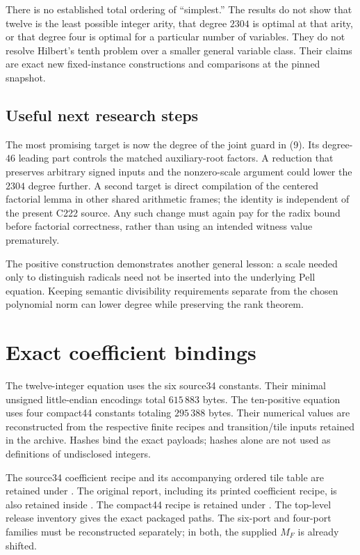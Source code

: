 \documentclass[11pt,letterpaper]{article}
\theoremstyle{definition}\newtheorem{definition}[theorem]{Definition}
\theoremstyle{remark}\newtheorem{remark}[theorem]{Remark}
\begin{document}
There is no established total ordering of ``simplest.'' The results do not show that twelve is the least possible integer arity, that degree $2304$ is optimal at that arity, or that degree four is optimal for a particular number of variables. They do not resolve Hilbert's tenth problem over a smaller general variable class. Their claims are exact new fixed-instance constructions and comparisons at the pinned snapshot.

\subsection{Useful next research steps}
The most promising target is now the degree of the joint guard in (9). Its degree-$46$ leading part controls the matched auxiliary-root factors. A reduction that preserves arbitrary signed inputs and the nonzero-scale argument could lower the $2304$ degree further. A second target is direct compilation of the centered factorial lemma in other shared arithmetic frames; the identity is independent of the present C222 source. Any such change must again pay for the radix bound before factorial correctness, rather than using an intended witness value prematurely.

The positive construction demonstrates another general lesson: a scale needed only to distinguish radicals need not be inserted into the underlying Pell equation. Keeping semantic divisibility requirements separate from the chosen polynomial norm can lower degree while preserving the rank theorem.

\appendix
\section{Exact coefficient bindings}\label{app:constants}
The twelve-integer equation uses the six source34 constants. Their minimal unsigned little-endian encodings total $615\,883$ bytes. The ten-positive equation uses four compact44 constants totaling $295\,388$ bytes. Their numerical values are reconstructed from the respective finite recipes and transition/tile inputs retained in the archive. Hashes bind the exact payloads; hashes alone are not used as definitions of undisclosed integers.

The source34 coefficient recipe and its accompanying ordered tile table are
retained under . The original report,
including its printed coefficient recipe, is also retained inside
.
The compact44 recipe is retained under
.
The top-level release inventory gives the exact packaged paths. The six-port and four-port families must be reconstructed separately; in both, the supplied $M_F$ is already shifted.
\end{document}
